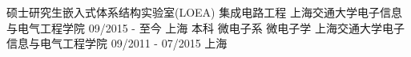 

\begin{cventries}

  \cventry
    {\hspace{0.75cm}硕士研究生\hspace{0.25cm}嵌入式体系结构实验室(LOEA)\hspace{0.25cm} 集成电路工程} %
    {上海交通大学\hspace{0.1cm}电子信息与电气工程学院} %
    {09/2015 - 至今} %
    {上海} %
    {
    }
    \cventry
    {\hspace{0.7cm}本科	\hspace{0.25cm}	微电子系\hspace{0.25cm} 微电子学} %
    {上海交通大学\hspace{0.1cm}电子信息与电气工程学院} %
    {09/2011 - 07/2015} %
    {上海} %
    {
    }


\end{cventries}
